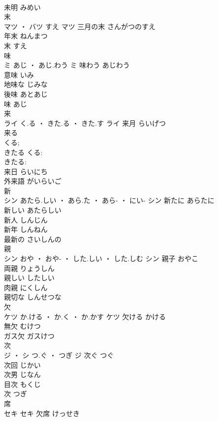 \documentclass[8pt]{extreport}
\begin{document}
\begin{CJK}{UTF8}{min}
\\	未明	みめい	
\\	末	
\\	マツ ・ バツ	すえ	マツ	三月の末	さんがつのすえ	
\\	年末	ねんまつ	
\\	末	すえ	
\\	味	
\\	ミ	あじ ・ あじ.わう	ミ	味わう	あじわう	
\\	意味	いみ	
\\	地味な	じみな	
\\	後味	あとあじ	
\\	味	あじ	
\\	来	
\\	ライ	く.る ・ きた.る ・ きた.す	ライ	来月	らいげつ	
\\	来る 
\\	くる; 
\\	きたる	くる:
\\	きたる: 
\\	来日	らいにち	
\\	外来語	がいらいご	
\\	新	
\\	シン	あたら.しい ・ あら.た ・ あら- ・ にい-	シン	新たに	あらたに	
\\	新しい	あたらしい	
\\	新人	しんじん	
\\	新年	しんねん	
\\	最新の	さいしんの	
\\	親	
\\	シン	おや ・ おや- ・ した.しい ・ した.しむ	シン	親子	おやこ	
\\	両親	りょうしん	
\\	親しい	したしい	
\\	肉親	にくしん	
\\	親切な	しんせつな	
\\	欠	
\\	ケツ	か.ける ・ か.く ・ か.かす	ケツ	欠ける	かける	
\\	無欠	むけつ	
\\	ガス欠	ガスけつ	
\\	次	
\\	ジ ・ シ	つ.ぐ ・ つぎ	ジ	次ぐ	つぐ	
\\	次回	じかい	
\\	次男	じなん	
\\	目次	もくじ	
\\	次	つぎ	
\\	席	
\\	セキ		セキ	欠席	けっせき	

\end{CJK}
\end{document}
